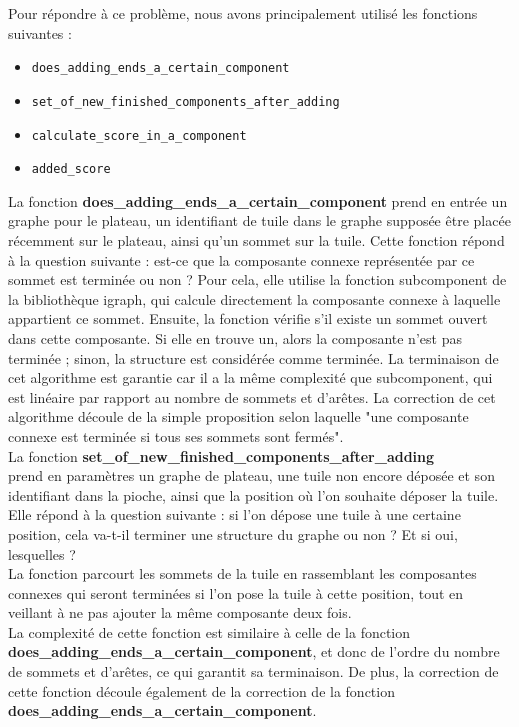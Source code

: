 \documentclass[10pt]{article}
\begin{document}
Pour répondre à ce problème, nous avons principalement utilisé les fonctions suivantes :
\begin{itemize}
    \item \texttt{does\_adding\_ends\_a\_certain\_component}
    \item \texttt{set\_of\_new\_finished\_components\_after\_adding}
    \item \texttt{calculate\_score\_in\_a\_component}
    \item \texttt{added\_score}
\end{itemize}
La fonction \textbf{does\_adding\_ends\_a\_certain\_component} prend en entrée un graphe pour le plateau, un identifiant de tuile dans le graphe supposée être placée récemment sur le plateau, ainsi qu'un sommet sur la tuile. Cette fonction répond à la question suivante : est-ce que la composante connexe représentée par ce sommet est terminée ou non ? Pour cela, elle utilise la fonction subcomponent de la bibliothèque igraph, qui calcule directement la composante connexe à laquelle appartient ce sommet. Ensuite, la fonction vérifie s'il existe un sommet ouvert dans cette composante. Si elle en trouve un, alors la composante n'est pas terminée ; sinon, la structure est considérée comme terminée. La terminaison de cet algorithme est garantie car il a la même complexité que subcomponent, qui est linéaire par rapport au nombre de sommets et d'arêtes. La correction de cet algorithme découle de la simple proposition selon laquelle "une composante connexe est terminée si tous ses sommets sont fermés".\\
La fonction \textbf{set\_of\_new\_finished\_components\_after\_adding}\\ prend en paramètres un graphe de plateau, une tuile non encore déposée et son identifiant dans la pioche, ainsi que la position où l'on souhaite déposer la tuile. Elle répond à la question suivante : si l'on dépose une tuile à une certaine position, cela va-t-il terminer une structure du graphe ou non ? Et si oui, lesquelles ?\\

La fonction parcourt les sommets de la tuile en rassemblant les composantes connexes qui seront terminées si l'on pose la tuile à cette position, tout en veillant à ne pas ajouter la même composante deux fois.\\
La complexité de cette fonction est similaire à celle de la fonction \\\textbf{does\_adding\_ends\_a\_certain\_component}, et donc de l'ordre du nombre de sommets et d'arêtes, ce qui garantit sa terminaison. De plus, la correction de cette fonction découle également de la correction de la fonction \\\textbf{does\_adding\_ends\_a\_certain\_component}.\\
\end{document}
